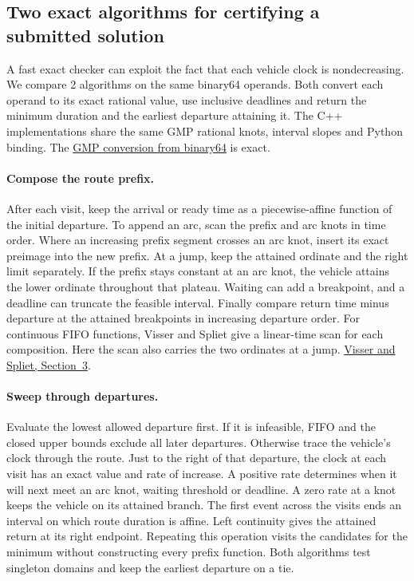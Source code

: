 \subsection{Two exact algorithms for certifying a submitted solution}\label{app:td-native}

A fast exact checker can exploit the fact that each vehicle clock is nondecreasing. We compare 2 algorithms on the same binary64 operands. Both convert each operand to its exact rational value, use inclusive deadlines and return the minimum duration and the earliest departure attaining it. The C++ implementations share the same GMP rational knots, interval slopes and Python binding. The \href{https://gmplib.org/manual/Rational-Conversions}{GMP conversion from binary64} is exact.

\paragraph{Compose the route prefix.}
After each visit, keep the arrival or ready time as a piecewise-affine function of the initial departure. To append an arc, scan the prefix and arc knots in time order. Where an increasing prefix segment crosses an arc knot, insert its exact preimage into the new prefix. At a jump, keep the attained ordinate and the right limit separately. If the prefix stays constant at an arc knot, the vehicle attains the lower ordinate throughout that plateau. Waiting can add a breakpoint, and a deadline can truncate the feasible interval. Finally compare return time minus departure at the attained breakpoints in increasing departure order. For continuous FIFO functions, Visser and Spliet give a linear-time scan for each composition. Here the scan also carries the two ordinates at a jump. \href{https://repub.eur.nl/pub/100852/EI2017-23.pdf}{Visser and Spliet, Section~3}.

\paragraph{Sweep through departures.}
Evaluate the lowest allowed departure first. If it is infeasible, FIFO and the closed upper bounds exclude all later departures. Otherwise trace the vehicle's clock through the route. Just to the right of that departure, the clock at each visit has an exact value and rate of increase. A positive rate determines when it will next meet an arc knot, waiting threshold or deadline. A zero rate at a knot keeps the vehicle on its attained branch. The first event across the visits ends an interval on which route duration is affine. Left continuity gives the attained return at its right endpoint. Repeating this operation visits the candidates for the minimum without constructing every prefix function. Both algorithms test singleton domains and keep the earliest departure on a tie.


